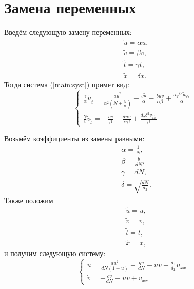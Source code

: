 \documentclass{article}
\begin{document}
\section{Замена переменных}

Введём следующую замену переменных:
\begin{equation*}
\begin{aligned}
&\tilde{u} = \alpha u,\\
&\tilde{v} = \beta v,\\
&\tilde{t} = \gamma t,\\
&\tilde{x} = \delta x.
\end{aligned}
\end{equation*}
Тогда система (\ref{main:syst}) примет вид:
\begin{equation*}
\begin{cases}
\frac{\gamma}{\alpha} \tilde{u}_{\tilde{t}} =\frac{a \tilde{u}^2}{\alpha^2 \left(N + \frac{\tilde{u}}{\alpha}\right)} - \frac{g \tilde{u}}{\alpha} - \frac{b \tilde{u} \tilde{v}}{\alpha \beta} + \frac{d_1 \delta^2 \tilde{u}_{\tilde{x} \tilde{x}}}{\alpha}\\
\frac{\gamma}{\beta} \tilde{v}_{\tilde{t}} = -\frac{c \tilde{v}}{\beta} + \frac{d \tilde{u} \tilde{v}}{\alpha \beta} + \frac{d_2 \delta^2 \tilde{v}_{\tilde{x} \tilde{x}}}{\beta}
\end{cases}
\end{equation*}

Возьмём коэффициенты из замены равными:
\begin{equation*}
\begin{aligned}
&\alpha = \frac{1}{N},\\
&\beta = \frac{b}{dN},\\
&\gamma = dN,\\
&\delta = \sqrt{\frac{dN}{d_2}}.
\end{aligned}
\end{equation*}
Также положим 
\begin{equation*}
\begin{aligned}
&\tilde{u} = u,\\
&\tilde{v} = v,\\
&\tilde{t} = t,\\
&\tilde{x} = x,
\end{aligned}
\end{equation*}
и получим следующую систему:
\begin{equation*}
\begin{cases}
\dot u =\frac{a u^2}{dN(1 + u)} - \frac{gu}{dN} - uv + \frac{d_1}{d_2} u_{x x}\\
\dot v = - \frac{cv}{dN} + uv + v_{xx}
\end{cases}
\end{equation*}
\end{document}
